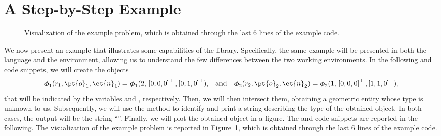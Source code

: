 
\section{A Step-by-Step Example}

\begin{figure}[htb]
  \centering
  \small{}
  \caption{Visualization of the example problem, which is obtained through the last 6 lines of the \Matlab{} example code.}
  \label{app1:fig:acme_example}
\end{figure}

We now present an example that illustrates some capabilities of the \Acme{} library. Specifically, the same example will be presented in both the \cpp{} language and the \Matlab{} environment, allowing us to understand the few differences between the two working environments. In the following \cpp{} and \Matlab{} code snippets, we will create the \Disk{} objects
%
\begin{equation*}
  \boldsymbol{\phi}_1(r_1, \pt{o}_1, \et{n}_1) = \boldsymbol{\phi}_1(2, \, \left[0, 0, 0\right]^{\top}, \left[0, 1, 0\right]^{\top}) \text{,} \quad \text{and} \quad
  \boldsymbol{\phi}_2(r_2, \pt{o}_2, \et{n}_2) = \boldsymbol{\phi}_2(1, \, \left[0, 0, 0\right]^{\top}, \left[1, 1, 0\right]^{\top}) \text{,}
\end{equation*}
%
that will be indicated by the variables  and , respectively. Then, we will then intersect them, obtaining a geometric entity whose type is unknown to us. Subsequently, we will use the  method to identify and print a string describing the type of the obtained \Entity{} object. In both cases, the output will be the string ``''. Finally, we will plot the obtained \Entity{} object in a \Matlab{} figure. The \cpp{} and \Matlab{} code snippets are reported in the following. The visualization of the example problem is reported in Figure~\ref{app1:fig:acme_example}, which is obtained through the last 6 lines of the \Matlab{} example code. \\[1.0em]

